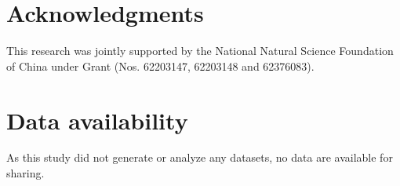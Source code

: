 \documentclass[preprint,review,fleqn,sort&compress,3p]{elsarticle}
\theoremstyle{definition} %
\theoremstyle{definition}%
\begin{document}
\section*{Acknowledgments}
This research was jointly supported by the National Natural Science Foundation of China under Grant (Nos. 62203147, 62203148 and 62376083).
\section*{Data availability}
As this study did not generate or analyze any datasets, no data are available for sharing.

 
 
\end{document}
